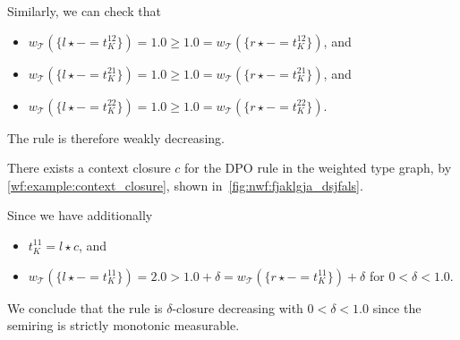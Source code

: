 \begin{example}
    Similarly, we can check that 
        \begin{itemize}
            \item $w_\mathcal{T}(\{l \star - = t_K^{12}\}) = 1.0 \geq 1.0 = w_\mathcal{T}(\{r \star - = t_K^{12}\})$, and
            \item $w_\mathcal{T}(\{l \star - = t_K^{21}\}) = 1.0 \geq 1.0 = w_\mathcal{T}(\{r \star - = t_K^{21}\})$, and
            \item $w_\mathcal{T}(\{l \star - = t_K^{22}\}) = 1.0 \geq 1.0 = w_\mathcal{T}(\{r \star - = t_K^{22}\})$.
        \end{itemize}
    The rule is therefore weakly decreasing.

    There exists a context closure $c$ for the DPO rule in the weighted type graph, by \autoref{wf:example:context_closure}, shown in~\autoref{fig:nwf:fjaklgja_dsjfals}.
    \begin{figure}[H]
        \centering
    \caption{}
    \label{fig:nwf:fjaklgja_dsjfals}
  \end{figure}
    Since we have additionally 
    \begin{itemize}
        \item $t_K^{11} = l \star c$, and 
        \item $w_\mathcal{T}(\{l \star - = t_K^{11}\}) = 2.0 > 1.0 + \delta = w_\mathcal{T}(\{r \star - = t_K^{11}\}) + \delta$ for $0 < \delta < 1.0$.
    \end{itemize} 
    We conclude that the rule is $\delta$-closure decreasing with $0 < \delta < 1.0$ since the semiring is strictly monotonic measurable.
\end{example} 

